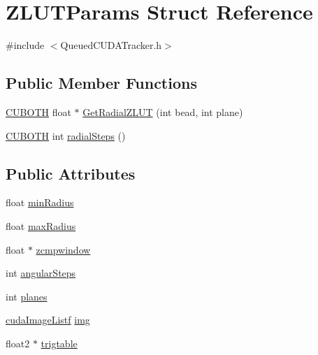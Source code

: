 \hypertarget{struct_z_l_u_t_params}{}\section{Z\+L\+U\+T\+Params Struct Reference}
\label{struct_z_l_u_t_params}


{\ttfamily \#include $<$Queued\+C\+U\+D\+A\+Tracker.\+h$>$}

\subsection*{Public Member Functions}
\begin{DoxyCompactItemize}
\item 
\hyperlink{gpu__utils_8h_ac50b87a58396e77c6168aa6f3be3c189}{C\+U\+B\+O\+TH} float $\ast$ \hyperlink{struct_z_l_u_t_params_a2a35427b775e56a0079b9029d1afbb9e}{Get\+Radial\+Z\+L\+UT} (int bead, int plane)
\item 
\hyperlink{gpu__utils_8h_ac50b87a58396e77c6168aa6f3be3c189}{C\+U\+B\+O\+TH} int \hyperlink{struct_z_l_u_t_params_a9579a1f453fa4966bbd7ca5c04a389d9}{radial\+Steps} ()
\end{DoxyCompactItemize}
\subsection*{Public Attributes}
\begin{DoxyCompactItemize}
\item 
float \hyperlink{struct_z_l_u_t_params_a1e53b221a353b5543b95ab8472c0e27f}{min\+Radius}
\item 
float \hyperlink{struct_z_l_u_t_params_a828d7befc2a73cbe77d5fead8987b916}{max\+Radius}
\item 
float $\ast$ \hyperlink{struct_z_l_u_t_params_a5e4fca6a1f41e9dee7ba0614ab4c202d}{zcmpwindow}
\item 
int \hyperlink{struct_z_l_u_t_params_a01c4d68849034d30553c2bbb353b9376}{angular\+Steps}
\item 
int \hyperlink{struct_z_l_u_t_params_ab00dffe1d70415e23bbf989d664495ab}{planes}
\item 
\hyperlink{_queued_c_u_d_a_tracker_8h_a84de79f5d4b6e4c8d5622fe712c1bd69}{cuda\+Image\+Listf} \hyperlink{struct_z_l_u_t_params_a14a59385e3d76c6e50dd1d97ef5f3cac}{img}
\item 
float2 $\ast$ \hyperlink{struct_z_l_u_t_params_a18e5051a3a4b118b45854c69977e2dbe}{trigtable}
\end{DoxyCompactItemize}


